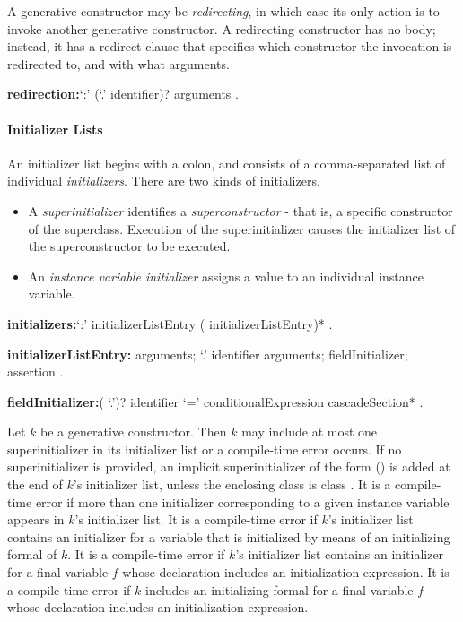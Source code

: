 \documentclass{article}
\begin{document}
\LMHash{}
A generative constructor may be {\em redirecting}, in which case its only action is to invoke another generative constructor.
A redirecting constructor has no body; instead, it has a redirect clause that specifies which constructor the invocation is redirected to, and with what arguments.

\begin{grammar}
{\bf redirection:}`{\escapegrammar :}' \THIS{} (`{\escapegrammar .}' identifier)? arguments
  .
\end{grammar}


\paragraph{Initializer Lists}

\LMHash{}
An initializer list begins with a colon, and consists of a comma-separated list of individual {\em initializers}.
There are two kinds of initializers.
\begin{itemize}
\item A {\em superinitializer} identifies a {\em superconstructor} - that is, a specific constructor of the superclass.
Execution of the superinitializer causes the initializer list of the superconstructor to be executed.
\item An {\em instance variable initializer} assigns a value to an individual instance variable.
\end{itemize}

\begin{grammar}
{\bf initializers:}`{\escapegrammar :}' initializerListEntry (\gcomma{} initializerListEntry)*
  .

{\bf initializerListEntry:}\SUPER{} arguments;
  \SUPER{} `{\escapegrammar .}' identifier arguments;
  fieldInitializer;
  assertion
  .

{\bf fieldInitializer:}(\THIS{} `{\escapegrammar .}')? identifier `=' conditionalExpression cascadeSection*
  .
\end{grammar}

\LMHash{}
Let $k$ be a generative constructor.
Then $k$ may include at most one superinitializer in its initializer list or a compile-time error occurs.
If no superinitializer is provided, an implicit superinitializer of the form \SUPER{}() is added at the end of $k$'s initializer list,
unless the enclosing class is class .
It is a compile-time error if more than one initializer corresponding to a given instance variable appears in $k$'s initializer list.
It is a compile-time error if $k$'s initializer list contains an initializer for a variable that is initialized by means of an initializing formal of $k$.
It is a compile-time error if $k$'s initializer list contains an initializer for a final variable $f$ whose declaration includes an initialization expression.
It is a compile-time error if $k$ includes an initializing formal for a final variable $f$ whose declaration includes an initialization expression.
\end{document}
